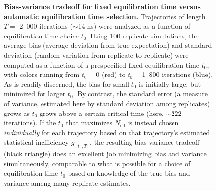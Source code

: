 \documentclass[aps,pre,twocolumn,nofootinbib,superscriptaddress,linenumbers,11point]{revtex4-1}
\begin{document}

\begin{figure} 
\caption{\label{figure:bias-variance} {\bf Bias-variance tradeoff for fixed equilibration time versus automatic equilibration time selection.} 
Trajectories of length $T = $ 2~000 iterations ($\sim$14 ns) were analyzed as a function of equilibration time choice $t_0$.
Using 100 replicate simulations, the average bias (average deviation from true expectation) and standard deviation (random variation from replicate to replicate) were computed as a function of a prespecified fixed equilibration time $t_0$, with colors running from $t_0 = 0$ (red) to $t_0 =$1~800 iterations (blue).
As is readily discerned, the bias for small $t_0$ is initially large, but minimized for larger $t_0$.
By contrast, the standard error (a measure of variance, estimated here by standard deviation among replicates) grows as $t_0$ grows above a certain critical time (here, $\sim$222 iterations).
If the $t_0$ that maximizes $N_\mathrm{eff}$ is instead chosen \emph{individually} for each trajectory based on that trajectory's estimated statistical inefficiency $g_{[t_0,T]}$, the resulting bias-variance tradeoff (black triangle) does an excellent job minimizing bias and variance simultaneously, comparable to what is possible for a choice of equilibration time $t_0$ based on knowledge of the true bias and variance among many replicate estimates.
}
\end{figure}
\end{document}
